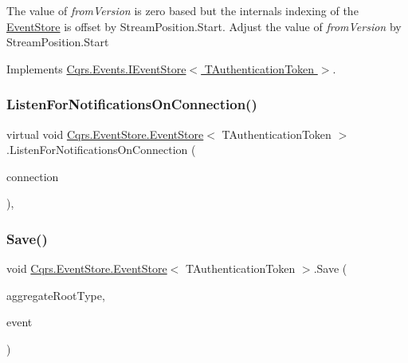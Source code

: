 The value of {\itshape from\+Version}  is zero based but the internals indexing of the \hyperlink{classCqrs_1_1EventStore_1_1EventStore}{Event\+Store} is offset by Stream\+Position.\+Start. Adjust the value of {\itshape from\+Version}  by Stream\+Position.\+Start 

Implements \hyperlink{interfaceCqrs_1_1Events_1_1IEventStore_add6227e2978ff8656aad79b1a51bf34c_add6227e2978ff8656aad79b1a51bf34c}{Cqrs.\+Events.\+I\+Event\+Store$<$ T\+Authentication\+Token $>$}.

\mbox{\label{classCqrs_1_1EventStore_1_1EventStore_add7396a800fe8f64c61406311e8fee1d_add7396a800fe8f64c61406311e8fee1d}} 
\subsubsection{\texorpdfstring{Listen\+For\+Notifications\+On\+Connection()}{ListenForNotificationsOnConnection()}}
{\footnotesize\ttfamily virtual void \hyperlink{classCqrs_1_1EventStore_1_1EventStore}{Cqrs.\+Event\+Store.\+Event\+Store}$<$ T\+Authentication\+Token $>$.Listen\+For\+Notifications\+On\+Connection (\begin{DoxyParamCaption}\item[{I\+Event\+Store\+Connection}]{connection }\end{DoxyParamCaption})\hspace{0.3cm}{\ttfamily [protected]}, {\ttfamily [virtual]}}

\mbox{\label{classCqrs_1_1EventStore_1_1EventStore_adce33037e2a3eb81cfccded42ba2ed35_adce33037e2a3eb81cfccded42ba2ed35}} 
\subsubsection{\texorpdfstring{Save()}{Save()}}
{\footnotesize\ttfamily void \hyperlink{classCqrs_1_1EventStore_1_1EventStore}{Cqrs.\+Event\+Store.\+Event\+Store}$<$ T\+Authentication\+Token $>$.Save (\begin{DoxyParamCaption}\item[{Type}]{aggregate\+Root\+Type,  }\item[{\hyperlink{interfaceCqrs_1_1Events_1_1IEvent}{I\+Event}$<$ T\+Authentication\+Token $>$ @}]{event }\end{DoxyParamCaption})}



